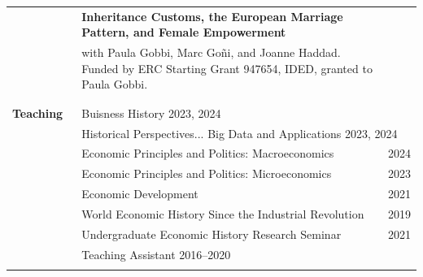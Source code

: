 \documentclass[a4paper,11pt,oneside]{article}
\begin{document}
\begin{longtable}{@{} p{0.175\linewidth} p{0.775\linewidth} p{0.05\linewidth}}
   \\  
   & \textbf{Inheritance Customs, the European Marriage Pattern, and Female Empowerment}\\ 

   &  with Paula Gobbi, Marc Go\~{n}i, and Joanne Haddad. Funded by ERC Starting Grant 947654, IDED, granted to Paula Gobbi. &  \\
   \\
   & &
   \\  
   
   
   
   
   \textbf{\large{Teaching}} &  \multicolumn{2}{l}{Buisness History  \hfill 2023, 2024} \\ 
   &  \multicolumn{2}{l}{Historical Perspectives... Big Data and Applications  \hfill 2023, 2024} \\ 
   & Economic Principles and Politics: Macroeconomics & \hfill 2024 \\
   &Economic Principles and Politics: Microeconomics & \hfill 2023 \\
   & Economic Development & \hfill 2021\\
   &  World Economic History Since the Industrial Revolution &\hfill 2019\\
   & Undergraduate Economic History Research Seminar & \hfill  2021 \\
   & Teaching Assistant 2016--2020\\
   
   \\
   

\end{longtable}
\end{document}
